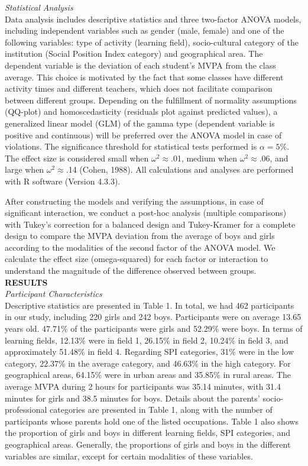 \documentclass[12pt,a4paper]{article}
\begin{document}
	\textit{Statistical Analysis}\\
	Data analysis includes descriptive statistics and three two-factor ANOVA models, including independent variables such as gender (male, female) and one of the following variables: type of activity (learning field), socio-cultural category of the institution (Social Position Index category) and geographical area. The dependent variable is the deviation of each student's MVPA from the class average. This choice is motivated by the fact that some classes have different activity times and different teachers, which does not facilitate comparison between different groups. Depending on the fulfillment of normality assumptions (QQ-plot) and homoscedasticity (residuals plot against predicted values), a generalized linear model (GLM) of the gamma type (dependent variable is positive and continuous) will be preferred over the ANOVA model in case of violations. The significance threshold for statistical tests performed is $\alpha = 5\%$. The effect size is considered small when $\omega^2\approx$.01, medium when $\omega^2\approx$.06, and large when $\omega^2\approx$.14 (Cohen, 1988). All calculations and analyses are performed with R software (Version 4.3.3).
	
	After constructing the models and verifying the assumptions, in case of significant interaction, we conduct a post-hoc analysis (multiple comparisons) with Tukey's correction for a balanced design and Tukey-Kramer for a complete design to compare the MVPA deviation from the average of boys and girls according to the modalities of the second factor of the ANOVA model. We calculate the effect size (omega-squared) for each factor or interaction to understand the magnitude of the difference observed between groups.\\
	
	\textbf{RESULTS}\\
	
	\textit{Participant Characteristics}\\
	
	Descriptive statistics are presented in Table 1. In total, we had 462 participants in our study, including 220 girls and 242 boys. Participants were on average 13.65 years old. 47.71\% of the participants were girls and 52.29\% were boys. In terms of learning fields, 12.13\% were in field 1, 26.15\% in field 2, 10.24\% in field 3, and approximately 51.48\% in field 4. Regarding SPI categories, 31\% were in the low category, 22.37\% in the average category, and 46.63\% in the high category. For geographical areas, 64.15\% were in urban areas and 35.85\% in rural areas. The average MVPA during 2 hours for participants was 35.14 minutes, with 31.4 minutes for girls and 38.5 minutes for boys. Details about the parents' socio-professional categories are presented in Table 1, along with the number of participants whose parents hold one of the listed occupations. Table 1 also shows the proportion of girls and boys in different learning fields, SPI categories, and geographical areas. Generally, the proportions of girls and boys in the different variables are similar, except for certain modalities of these variables.
	
\end{document}
